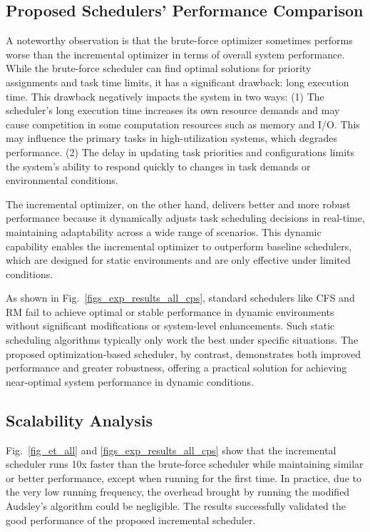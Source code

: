 	\subsection{Proposed Schedulers' Performance Comparison}

    A noteworthy observation is that the brute-force optimizer sometimes performs worse than the incremental optimizer in terms of overall system performance. While the brute-force scheduler can find optimal solutions for priority assignments and task time limits, it has a significant drawback: long execution time. This drawback negatively impacts the system in two ways:
    (1) The scheduler's long execution time increases its own resource demands and may cause competition in some computation resources such as memory and I/O. This may influence the primary tasks in high-utilization systems, which degrades performance.
    (2) The delay in updating task priorities and configurations limits the system's ability to respond quickly to changes in task demands or environmental conditions.

    The incremental optimizer, on the other hand, delivers better and more robust performance because it dynamically adjusts task scheduling decisions in real-time, maintaining adaptability across a wide range of scenarios. This dynamic capability enables the incremental optimizer to outperform baseline schedulers, which are designed for static environments and are only effective under limited conditions.

As shown in Fig.~\ref{figs_exp_results_all_cps}, standard schedulers like CFS and RM fail to achieve optimal or stable performance in dynamic environments without significant modifications or system-level enhancements. Such static scheduling algorithms typically only work the best under specific situations.
The proposed optimization-based scheduler, by contrast, demonstrates both improved performance and greater robustness, offering a practical solution for achieving near-optimal system performance in dynamic conditions.



	\subsection{Scalability Analysis}

    Fig.~\ref{fig_et_all} and \ref{figs_exp_results_all_cps} show that the incremental scheduler runs 10x faster than the brute-force scheduler while maintaining similar or better performance, except when running for the first time.
    In practice, due to the very low running frequency, the overhead brought by running the modified Audsley's algorithm could be negligible.
    The results successfully validated the good performance of the proposed incremental scheduler.

